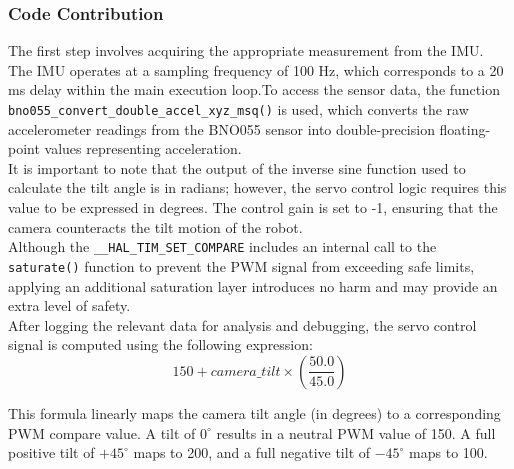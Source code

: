 \documentclass[english]{article}
\begin{document}
	\subsubsection{Code Contribution}
	The first step involves acquiring the appropriate measurement from the IMU. The IMU operates at a sampling frequency of 100 Hz, which corresponds to a 20 ms delay within the main execution loop.To access the sensor data, the function \texttt{bno055\_convert\_double\_accel\_xyz\_msq()} is used, which converts the raw accelerometer readings from the BNO055 sensor into double-precision floating-point values representing acceleration.\\
	It is important to note that the output of the inverse sine function used to calculate the tilt angle is in radians; however, the servo control logic requires this value to be expressed in degrees. The control gain is set to -1, ensuring that the camera counteracts the tilt motion of the robot.\\
	Although the \texttt{\_\_HAL\_TIM\_SET\_COMPARE} includes an internal call to the \texttt{saturate()} function to prevent the PWM signal from exceeding safe limits, applying an additional saturation layer introduces no harm and may provide an extra level of safety.\\After logging the relevant data for analysis and debugging, the servo control signal is computed using the following expression:\\
	
	\begin{equation}
		150+camera\_tilt\times (\frac{50.0}{45.0})
	\end{equation}
	
	This formula linearly maps the camera tilt angle (in degrees) to a corresponding PWM compare value. A tilt of \(0^\circ\) results in a neutral PWM value of 150. A full positive tilt of \(+45^\circ\) maps to 200, and a full negative tilt of \(-45^\circ\) maps to 100.\\
	
	
	 
	
	
\end{document}

